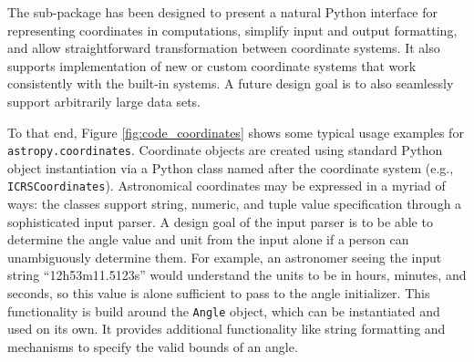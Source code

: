 \documentclass[traditabstract]{aa}
\begin{document}
The sub-package has been designed to present a natural Python interface for
representing coordinates in computations, simplify input and output formatting,
and allow straightforward transformation between coordinate systems. It also
supports implementation of new or custom coordinate systems that work
consistently with the built-in systems. A future design goal is to also
seamlessly support arbitrarily large data sets.

To that end, Figure \ref{fig:code_coordinates} shows some typical usage
examples for \texttt{astropy.coordinates}. Coordinate objects are created using
standard Python object instantiation via a Python class named after the
coordinate system (e.g., \texttt{ICRSCoordinates}). Astronomical coordinates
may be expressed in a myriad of ways: the classes support string, numeric, and
tuple value specification through a sophisticated input parser. A design goal
of the input parser is to be able to determine the angle value and unit from
the input alone if a person can unambiguously determine them. For example, an
astronomer seeing the input string ``12h53m11.5123s'' would understand the
units to be in hours, minutes, and seconds, so this value is alone sufficient
to pass to the angle initializer. This functionality is build around the
\texttt{Angle} object, which can be instantiated and used on its own. It
provides additional functionality like string formatting and mechanisms to
specify the valid bounds of an angle.
\end{document}
